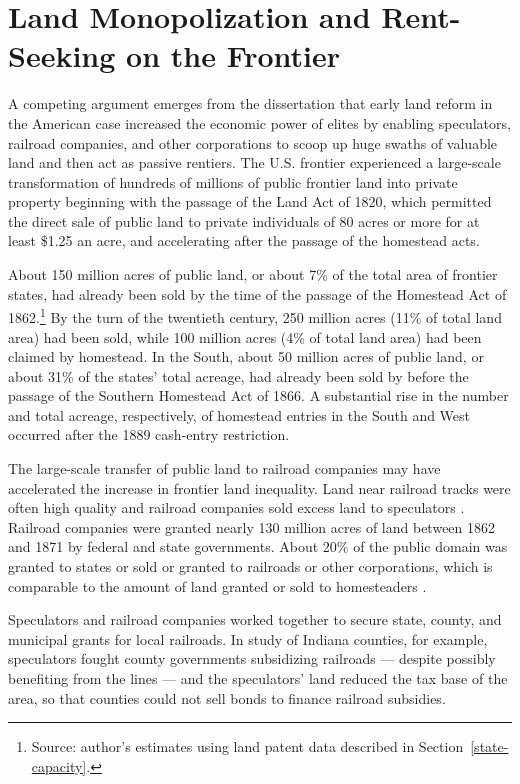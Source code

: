 \section{Land Monopolization and Rent-Seeking on the Frontier} 

A competing argument emerges from the dissertation that early land reform in the American case increased the economic power of elites by enabling speculators, railroad companies, and other corporations to scoop up huge swaths of valuable land and then act as passive rentiers.  The U.S. frontier experienced a large-scale transformation of hundreds of millions of public frontier land into private property beginning with the passage of the Land Act of 1820, which permitted the direct sale of public land to private individuals of 80 acres or more for at least \$1.25 an acre, and accelerating after the passage of the homestead acts. 

About 150 million acres of public land, or about 7\% of the total area of frontier states, had already been sold by the time of the passage of the Homestead Act of 1862.\footnote{Source: author's estimates using land patent data described in Section~\ref{state-capacity}.} By the turn of the twentieth century, 250 million acres (11\% of total land area) had been sold, while 100 million acres (4\% of total land area) had been claimed by homestead. In the South, about 50 million acres of public land, or about 31\% of the states' total acreage, had already been sold by before the passage of the Southern Homestead Act of 1866. A substantial rise in the number and total acreage, respectively, of homestead entries in the South and West occurred after the 1889 cash-entry restriction.

The large-scale transfer of public land to railroad companies may have accelerated the increase in frontier land inequality. Land near railroad tracks were often high quality and railroad companies sold excess land to speculators \citep{murtazashvili2013political}. Railroad companies were granted nearly 130 million acres of land between 1862 and 1871 by federal and state governments. About 20\% of the public domain was granted to states or sold or granted to railroads or other corporations, which is comparable to the amount of land granted or sold to homesteaders \citep{shanks2005homestead}.

Speculators and railroad companies worked together to secure state, county, and municipal grants for local railroads. In  study of Indiana counties, for example, speculators fought county governments subsidizing railroads --- despite possibly benefiting from the lines --- and the speculators' land reduced the tax base of the area, so that counties could not sell bonds to finance railroad subsidies. 

